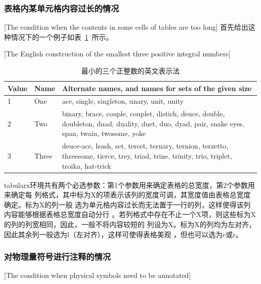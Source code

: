 \subsubsection{表格内某单元格内容过长的情况}[The condition when the contents in
some cells of tables are too long]
首先给出这种情况下的一个例子如表~\ref{table3}~所示。
\begin{table}[htbp]
  \centering
\caption{最小的三个正整数的英文表示法}[The English construction of the smallest three positive integral numbers]\label{table3}\wuhao
\begin{tabularx}{0.7\textwidth}{llX}
\toprule
Value & Name & Alternate names, and names for sets of the given size\\
\midrule
1 & One & ace, single, singleton, unary, unit, unity\\
2 & Two & binary, brace, couple, couplet, distich, deuce, double, doubleton, duad, duality, duet, duo, dyad, pair, snake eyes, span, twain, twosome, yoke\\
3 & Three & deuce-ace, leash, set, tercet, ternary, ternion, terzetto, threesome, tierce, trey, triad, trine, trinity, trio, triplet, troika, hat-trick\\
\bottomrule
\end{tabularx}
\end{table}
tabularx环境共有两个必选参数：第1个参数用来确定表格的总宽度，第2个参数用来确定每
列格式，其中标为X的项表示该列的宽度可调，其宽度值由表格总宽度确定。标为X的列一般
选为单元格内容过长而无法置于一行的列，这样使得该列内容能够根据表格总宽度自动分行
。若列格式中存在不止一个X项，则这些标为X的列的列宽相同，因此，一般不将内容较短的
列设为X。标为X的列均为左对齐，因此其余列一般选为l（左对齐），这样可使得表格美观
，但也可以选为c或r。

\subsubsection{对物理量符号进行注释的情况}[The condition when physical symbols
need to be annotated]

